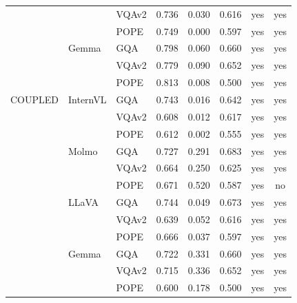 \begin{longtable}{@{\extracolsep{\fill}}lll rr r cc@{}}
 &  & VQAv2 & 0.736 & 0.030 & 0.616 & yes & yes \\
 &  & POPE & 0.749 & 0.000 & 0.597 & yes & yes \\
\addlinespace
 & Gemma & GQA & 0.798 & 0.060 & 0.660 & yes & yes \\
 &  & VQAv2 & 0.779 & 0.090 & 0.652 & yes & yes \\
 &  & POPE & 0.813 & 0.008 & 0.500 & yes & yes \\
\midrule
COUPLED & InternVL & GQA & 0.743 & 0.016 & 0.642 & yes & yes \\
 &  & VQAv2 & 0.608 & 0.012 & 0.617 & yes & yes \\
 &  & POPE & 0.612 & 0.002 & 0.555 & yes & yes \\
\addlinespace
 & Molmo & GQA & 0.727 & 0.291 & 0.683 & yes & yes \\
 &  & VQAv2 & 0.664 & 0.250 & 0.625 & yes & yes \\
 &  & POPE & 0.671 & 0.520 & 0.587 & yes & no \\
\addlinespace
 & LLaVA & GQA & 0.744 & 0.049 & 0.673 & yes & yes \\
 &  & VQAv2 & 0.639 & 0.052 & 0.616 & yes & yes \\
 &  & POPE & 0.666 & 0.037 & 0.597 & yes & yes \\
\addlinespace
 & Gemma & GQA & 0.722 & 0.331 & 0.660 & yes & yes \\
 &  & VQAv2 & 0.715 & 0.336 & 0.652 & yes & yes \\
 &  & POPE & 0.600 & 0.178 & 0.500 & yes & yes \\
\end{longtable}
\normalsize
